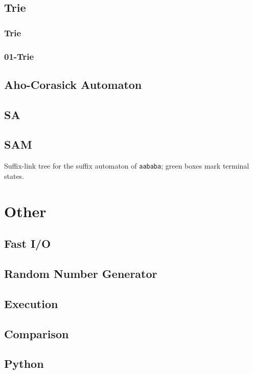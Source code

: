 \documentclass[10pt,a4paper]{article}
\newcommand{\codedir}{../code/}
\newcommand{\sourcedir}{../source/}
\newcommand{\code}[2][]{%
}
\begin{document}
\begin{multicols}{2}
\subsection{Trie}

\subsubsection{Trie}
\code{Trie.cpp}

\subsubsection{01-Trie}
\code{01-Trie.cpp}

\subsection{Aho-Corasick Automaton}
\code{AC.cpp}

\subsection{SA}
\code{SA.cpp}

\subsection{SAM}
\code{SAM.cpp}

\begin{center}
    \captionsetup{type=figure,font=small}
    \resizebox{0.9\linewidth}{!}{}
    \caption{Suffix-link tree for the suffix automaton of \texttt{aababa};
             green boxes mark terminal states.}
    \label{fig:sam-suffix-link-tree}
\end{center}

\section{Other}

\subsection{Fast I/O}
\code{Fast IO.cpp}

\subsection{Random Number Generator}
\code{Random.cpp}

\subsection{Execution}
\code[language=bash]{Run.bash}
\code[language=PowerShell]{run.ps1}

\subsection{Comparison}
\code[language=bash]{Cmp.sh}

\subsection{Python}
\code[language=python]{python.py}

\end{multicols}
\end{document}
